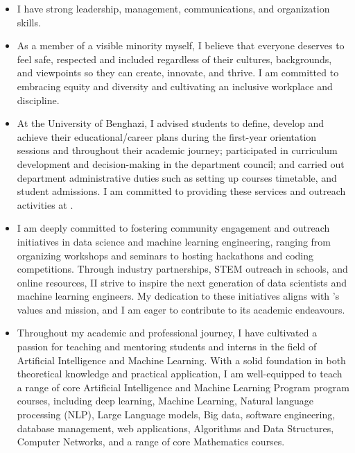 \documentclass[letterpaper,11pt,oneside]{article}
\newcommand{\ignore}[1]{}
\begin{document}
\begin{itemize}
    
      \item I have strong leadership, management, communications, and organization skills.
      
    \item As a member of a visible minority myself, I believe that everyone deserves to feel safe, respected and included regardless of their cultures, backgrounds, and viewpoints so they can create, innovate, and thrive. I am committed to embracing equity and diversity and cultivating an inclusive workplace and discipline.
    
  \item At the University of Benghazi, I advised students to define, develop and achieve their educational/career plans during the first-year orientation sessions and throughout their academic journey; participated in curriculum development and decision-making in the department council; and carried out department administrative duties such as setting up courses timetable, and student admissions. I am committed to providing these services and outreach activities at \youruniversity.
  
  \item I am deeply committed to fostering community engagement and outreach initiatives in data science and machine learning engineering, ranging from organizing workshops and seminars to hosting hackathons and coding competitions. Through industry partnerships, STEM outreach in schools, and online resources, II strive to inspire the next generation of data scientists and machine learning engineers. My dedication to these initiatives aligns with  \youruniversity's values and mission, and I am eager to contribute to its academic endeavours.
  
 \item Throughout my academic and professional journey, I have cultivated a passion for teaching and mentoring students and interns in the field of \ignore{Computer Engineering} Artificial Intelligence and Machine Learning. With a solid foundation in both theoretical knowledge and practical application, I am well-equipped to teach a range of core Artificial Intelligence and Machine Learning Program program courses, including deep learning, Machine Learning, Natural language processing (NLP), Large Language models, Big data, software engineering, database management, web applications, Algorithms and Data Structures, Computer Networks, and a range of core Mathematics courses.
\end{itemize}
\end{document}
